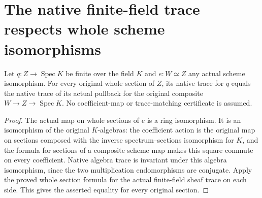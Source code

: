\section{The native finite-field trace respects whole scheme isomorphisms}

\begin{lemma}
\label{lem:kn-structure-trace-field-iso}
\leanok
Let $q:Z\to\operatorname{Spec}K$ be finite over the field $K$ and
$e:W\simeq Z$ any actual scheme isomorphism. For every original whole
section of $Z$, its native trace for $q$ equals the native trace of its
actual pullback for the original composite $W\to Z\to\operatorname{Spec}K$.
No coefficient-map or trace-matching certificate is assumed.
\end{lemma}
\begin{proof}
The actual map on whole sections of $e$ is a ring isomorphism. It is an
isomorphism of the original $K$-algebras: the coefficient action is the
original map on sections composed with the inverse spectrum--sections
isomorphism for $K$, and the formula for sections of a composite scheme
map makes this square commute on every coefficient. Native algebra
trace is invariant under this algebra isomorphism, since the two
multiplication endomorphisms are conjugate. Apply the proved whole
section formula for the actual finite-field sheaf trace on each side.
This gives the asserted equality for every original section.
\end{proof}
